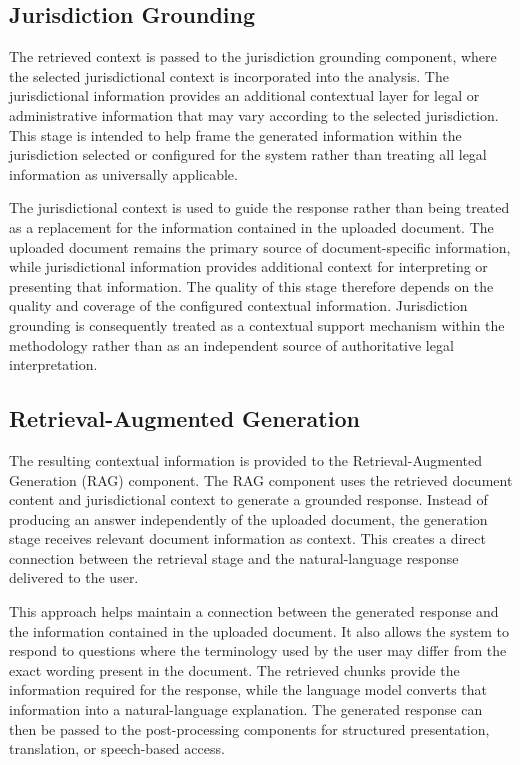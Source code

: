 \documentclass[12pt,a4paper,oneside]{report}
\begin{document}
\subsection{Jurisdiction Grounding}

The retrieved context is passed to the jurisdiction grounding component,
where the selected jurisdictional context is incorporated into the analysis.
The jurisdictional information provides an additional contextual layer for
legal or administrative information that may vary according to the selected
jurisdiction. This stage is intended to help frame the generated
information within the jurisdiction selected or configured for the system
rather than treating all legal information as universally applicable.

The jurisdictional context is used to guide the response rather than being
treated as a replacement for the information contained in the uploaded
document. The uploaded document remains the primary source of
document-specific information, while jurisdictional information provides
additional context for interpreting or presenting that information. The
quality of this stage therefore depends on the quality and coverage of the
configured contextual information. Jurisdiction grounding is consequently
treated as a contextual support mechanism within the methodology rather
than as an independent source of authoritative legal interpretation.

\subsection{Retrieval-Augmented Generation}

The resulting contextual information is provided to the
Retrieval-Augmented Generation (RAG) component. The RAG component uses the
retrieved document content and jurisdictional context to generate a grounded
response. Instead of producing an answer independently of the uploaded
document, the generation stage receives relevant document information as
context. This creates a direct connection between the retrieval stage and
the natural-language response delivered to the user.

This approach helps maintain a connection between the generated response and
the information contained in the uploaded document. It also allows the
system to respond to questions where the terminology used by the user may
differ from the exact wording present in the document. The retrieved chunks
provide the information required for the response, while the language model
converts that information into a natural-language explanation. The generated
response can then be passed to the post-processing components for structured
presentation, translation, or speech-based access.
\end{document}
